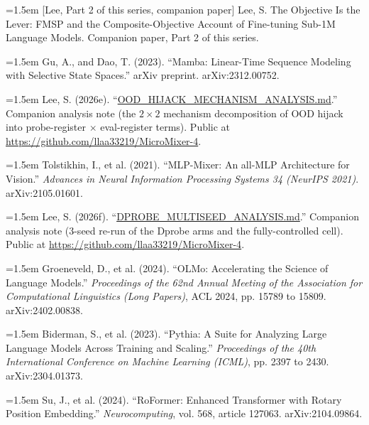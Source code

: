 \documentclass[11pt]{article}
\begin{document}
\par\hangindent=1.5em [Lee, Part 2 of this series, companion paper] Lee, S. The Objective Is the Lever: FMSP and the Composite-Objective Account of Fine-tuning Sub-1M Language Models. Companion paper, Part 2 of this series.

\par\hangindent=1.5em Gu, A., and Dao, T. (2023). ``Mamba: Linear-Time Sequence Modeling with Selective State Spaces.'' arXiv preprint. arXiv:2312.00752.

\par\hangindent=1.5em Lee, S. (2026e). ``\href{https://github.com/llaa33219/MicroMixer-4/blob/4bb630413dfa58ef3141291e121ab8c006d03235/OOD_HIJACK_MECHANISM_ANALYSIS.md}{OOD\_HIJACK\_MECHANISM\_ANALYSIS.md}.'' Companion analysis note (the $2\times 2$ mechanism decomposition of OOD hijack into probe-register $\times$ eval-register terms). Public at \url{https://github.com/llaa33219/MicroMixer-4}.

\par\hangindent=1.5em Tolstikhin, I., et al. (2021). ``MLP-Mixer: An all-MLP Architecture for Vision.'' \emph{Advances in Neural Information Processing Systems 34 (NeurIPS 2021)}. arXiv:2105.01601.

\par\hangindent=1.5em Lee, S. (2026f). ``\href{https://github.com/llaa33219/MicroMixer-4/blob/4bb630413dfa58ef3141291e121ab8c006d03235/DPROBE_MULTISEED_ANALYSIS.md}{DPROBE\_MULTISEED\_ANALYSIS.md}.'' Companion analysis note (3-seed re-run of the Dprobe arms and the fully-controlled cell). Public at \url{https://github.com/llaa33219/MicroMixer-4}.

\par\hangindent=1.5em Groeneveld, D., et al. (2024). ``OLMo: Accelerating the Science of Language Models.'' \emph{Proceedings of the 62nd Annual Meeting of the Association for Computational Linguistics (Long Papers)}, ACL 2024, pp. 15789 to 15809. arXiv:2402.00838.

\par\hangindent=1.5em Biderman, S., et al. (2023). ``Pythia: A Suite for Analyzing Large Language Models Across Training and Scaling.'' \emph{Proceedings of the 40th International Conference on Machine Learning (ICML)}, pp. 2397 to 2430. arXiv:2304.01373.

\par\hangindent=1.5em Su, J., et al. (2024). ``RoFormer: Enhanced Transformer with Rotary Position Embedding.'' \emph{Neurocomputing}, vol. 568, article 127063. arXiv:2104.09864.
\end{document}
